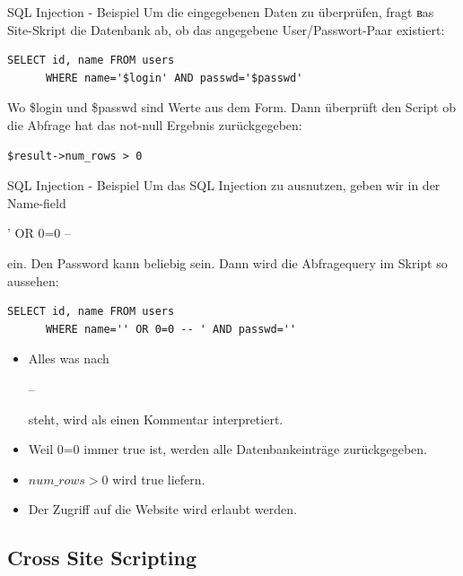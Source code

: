 \documentclass[10pt]{beamer}
\begin{document}
\begin{frame}[fragile]{SQL Injection - Beispiel}
  Um die eingegebenen Daten zu \"uberpr\"ufen, fragt вas Site-Skript die Datenbank ab, ob das angegebene User/Passwort-Paar existiert:
  \newline
  \begin{lstlisting}[style=SQLStyle]
    SELECT id, name FROM users
      WHERE name='$login' AND passwd='$passwd'
  \end{lstlisting}
  Wo \$login und \$passwd sind Werte aus dem Form.
  \newline
  Dann \"uberpr\"uft den Script ob die Abfrage hat das not-null Ergebnis zur\"uckgegeben:
  \newline
  \begin{lstlisting}[style=PHPStyle]
    $result->num_rows > 0
  \end{lstlisting}
\end{frame}

\begin{frame}[fragile]{SQL Injection - Beispiel}
  Um das SQL Injection zu ausnutzen, geben wir in der Name-field {\fboxsep=0pt\colorbox{mGreen!50}{\strut ' OR 0=0 -- }} ein.
  Den Password kann beliebig sein.
  \newline
  Dann wird die Abfragequery im Skript so aussehen:
  \newline
  \begin{lstlisting}[style=SQLStyle]
    SELECT id, name FROM users
      WHERE name='' OR 0=0 -- ' AND passwd=''
  \end{lstlisting}
  \begin{itemize}
    \item Alles was nach {\fboxsep=0pt\colorbox{mGreen!50}{\strut -- }} steht, wird als einen Kommentar interpretiert.
    \item Weil 0=0 immer true ist, werden alle Datenbankeintr\"age zur\"uckgegeben.
    \item $num\_rows>0$ wird true liefern.
    \item Der Zugriff auf die Website wird erlaubt werden.
  \end{itemize}

\end{frame}


\subsection{Cross Site Scripting}
\end{document}
